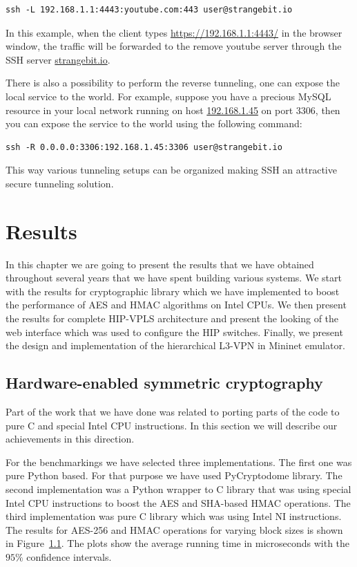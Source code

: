 \begin{verbatim}
ssh -L 192.168.1.1:4443:youtube.com:443 user@strangebit.io
\end{verbatim}

In this example, when the client types \url{https://192.168.1.1:4443/} in the browser window,
the traffic will be forwarded to the remove youtube server through the SSH server \url{strangebit.io}.

There is also a possibility to perform the reverse tunneling, \ie one can expose the local service to the world.
For example, suppose you have a precious MySQL resource in your local network running on host \url{192.168.1.45} 
on port $3306$, then you can expose the service to the world using the following command:

\begin{verbatim}
ssh -R 0.0.0.0:3306:192.168.1.45:3306 user@strangebit.io
\end{verbatim}

This way various tunneling setups can be organized making SSH an attractive secure tunneling 
solution.

\chapter{Results}

In this chapter we are going to present the results that we have obtained 
throughout several years that we have spent building various systems. We start 
with the results for cryptographic library which we have implemented to 
boost the performance of AES and HMAC algorithms on Intel CPUs. We then 
present the results for complete HIP-VPLS architecture and present the 
looking of the web interface which was used to configure the HIP switches.
Finally, we present the design and implementation of the hierarchical L3-VPN
in Mininet emulator.  

\section{Hardware-enabled symmetric cryptography}

Part of the work that we have done was related to porting parts of the code to pure C 
and special Intel CPU instructions. In this section we will describe our achievements 
in this direction. 

For the benchmarkings we have selected three implementations. The first one was pure 
Python based. For that purpose we have used PyCryptodome library. The second implementation
was a Python wrapper to C library that was using special Intel CPU instructions to boost 
the AES and SHA-based HMAC operations. The third implementation was pure C library 
which was using Intel NI instructions. The results for AES-256 and HMAC operations 
for varying block sizes is shown in Figure~\ref{}. The plots show the average 
running time in microseconds with the $95\%$ confidence intervals. 

